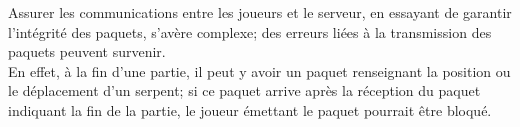 \par
Assurer les communications entre les joueurs et le serveur, en essayant de garantir l'intégrité des paquets, s'avère complexe; des erreurs liées à la transmission des paquets peuvent survenir.\\
En effet, à la fin d'une partie, il peut y avoir un paquet renseignant la position ou le déplacement d'un serpent; si ce paquet arrive après la réception du paquet indiquant la fin de la partie, le joueur émettant le paquet pourrait être bloqué.